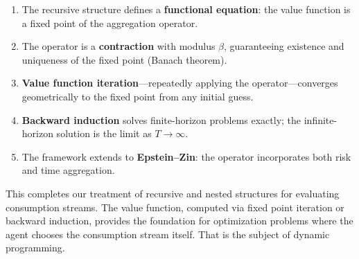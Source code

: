 \begin{calloutimportant}
\begin{enumerate}[label=(\roman*), leftmargin=2em]
    \item The recursive structure defines a \textbf{functional equation}: the value function is a fixed point of the aggregation operator.
    
    \item The operator is a \textbf{contraction} with modulus $\beta$, guaranteeing existence and uniqueness of the fixed point (Banach theorem).
    
    \item \textbf{Value function iteration}---repeatedly applying the operator---converges geometrically to the fixed point from any initial guess.
    
    \item \textbf{Backward induction} solves finite-horizon problems exactly; the infinite-horizon solution is the limit as $T \to \infty$.
    
    \item The framework extends to \textbf{Epstein--Zin}: the operator incorporates both risk and time aggregation.
\end{enumerate}
\end{calloutimportant}

This completes our treatment of recursive and nested structures for evaluating consumption streams. The value function, computed via fixed point iteration or backward induction, provides the foundation for optimization problems where the agent chooses the consumption stream itself. That is the subject of dynamic programming.
